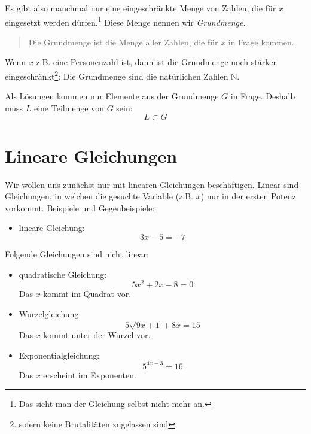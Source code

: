 \documentclass[%
11pt,%
twoside,%
titlepage,%
german,%
]{scrartcl}
\begin{document}
Es gibt also manchmal nur eine eingeschr\"ankte Menge von Zahlen, die f\"ur $x$ eingesetzt werden d\"urfen.\footnote{Das sieht man der Gleichung selbst nicht mehr an.} Diese Menge nennen wir \emph{Grundmenge}. 
\begin{quote}
  Die Grundmenge ist die Menge aller Zahlen, die f\"ur $x$ in Frage kommen.  
\end{quote}
Wenn $x$ z.B. eine Personenzahl ist, dann ist die Grundmenge noch st\"arker eingeschr\"ankt\footnote{sofern keine Brutalit\"aten zugelassen sind}: Die Grundmenge sind die nat\"urlichen Zahlen $\mathbb{N}$.

Als L\"osungen kommen nur Elemente aus der Grundmenge $G$ in Frage. Deshalb muss $L$ eine Teilmenge von $G$ sein:
\begin{displaymath}
  L \subset G
\end{displaymath}

\section{Lineare Gleichungen}
\label{lingl:lingl}

Wir wollen uns zun\"achst nur mit linearen Gleichungen besch\"aftigen. Linear sind Gleichungen, in welchen die gesuchte Variable (z.B. $x$) nur in der ersten Potenz vorkommt. Beispiele und Gegenbeispiele:

\begin{itemize}
\item lineare Gleichung:
  \begin{displaymath}
    3x - 5 = -7
  \end{displaymath}
\end{itemize}
Folgende Gleichungen sind nicht linear:
\begin{itemize}
\item quadratische Gleichung:
  \begin{displaymath}
    5x^2 + 2x - 8 = 0
  \end{displaymath}
  Das $x$ kommt im Quadrat vor.

\item Wurzelgleichung:
  \begin{displaymath}
    5\sqrt{9x+1} + 8x = 15
  \end{displaymath}
  Das $x$ kommt unter der Wurzel vor.

\item Exponentialgleichung:
  \begin{displaymath}
    5^{4x-3} = 16
  \end{displaymath}
  Das $x$ erscheint im Exponenten.
  
\end{itemize}
\end{document}
